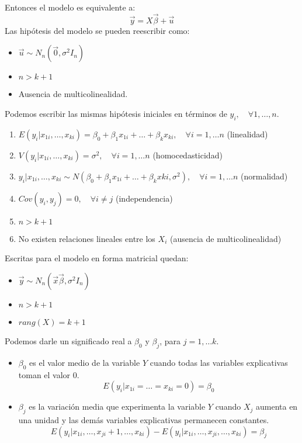Entonces el modelo es equivalente a:
$$\vec{y} = X\vec{\beta} + \vec{u}$$
Las hipótesis del modelo se pueden reescribir como:
\begin{itemize}
    \item $\vec{u} \sim N_n(\vec{0}, \sigma^2 I_n)$
    \item $n > k+1$
    \item Ausencia de multicolinealidad.
\end{itemize}
Podemos escribir las mismas hipótesis iniciales en términos de $y_i, \quad \forall 1, \dots, n$.
\begin{enumerate}
    \item $E(y_i | x_{1i}, \dots, x_{ki}) = \beta_0 + \beta_1x_{1i} + \dots + \beta_kx_{ki}, \quad \forall i = 1, \dots n$ (linealidad)
    \item $V(y_i | x_{1i}, \dots, x_{ki}) = \sigma^2, \quad \forall i = 1, \dots n$ (homocedasticidad)
    \item $y_i | x_{1i}, \dots, x_{ki} \sim N(\beta_0 + \beta_1x_{1i} + \dots + \beta_kx{ki}, \sigma^2), \quad \forall i = 1, \dots n$ (normalidad)
    \item $Cov(y_i, y_j) = 0, \quad \forall i \neq j$ (independencia)
    \item $n > k+1$
    \item No existen relaciones lineales entre los $X_i$ (ausencia de multicolinealidad)
\end{enumerate}
Escritas para el modelo en forma matricial quedan:
\begin{itemize}
    \item $\vec{y} \sim N_n(\vec{x}\vec{\beta}, \sigma^2 I_n)$
    \item $n > k+1$
    \item $rang(X) = k+1$
\end{itemize}

Podemos darle un significado real a $\beta_0$ y $\beta_j$, para $j = 1, \dots k$.
\begin{itemize}
    \item $\beta_0$ es el valor medio de la variable $Y$ cuando todas las variables explicativas toman el valor 0.
          $$E(y_i | x_{1i} = \dots = x_{ki} = 0) = \beta_0$$
    \item $\beta_j$ es la variación media que experimenta la variable $Y$ cuando $X_j$ aumenta en una unidad y las demás variables explicativas permanecen constantes.
          $$E(y_i | x_{1i}, \dots, x_{ji} + 1, \dots, x_{ki}) - E(y_i | x_{1i}, \dots, x_{ji}, \dots, x_{ki}) = \beta_j$$
\end{itemize}

